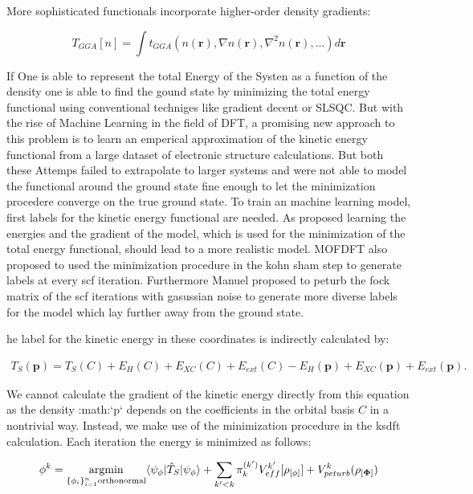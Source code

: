 More sophisticated functionals incorporate higher-order density gradients:

\begin{equation}
T_{GGA}[n] = \int t_{GGA}(n(\mathbf{r}), \nabla n(\mathbf{r}), \nabla^2 n(\mathbf{r}), ...) d\mathbf{r}
\end{equation}

If One is able to represent the total Energy of the Systen as a function of the density one is able to find the gound state by minimizing the total energy functional using conventional techniges like gradient decent or SLSQC.
But with the rise of Machine Learning in the field of DFT, a promising new approach to this problem is to learn an emperical approximation of the kinetic energy functional from a large dataset of electronic structure calculations. \cite{remmmmme}\cite{zhang_m-ofdft_2023}
But both these Attemps failed to extrapolate to larger systems and were not able to model the functional around the ground state fine enough to let the minimization procedere converge on the true ground state.
To train an machine learning model, first labels for the kinetic energy functional are needed. As \cite{zhang_m-ofdft_2023} proposed learning the energies and the gradient of the model, which is used for the minimization of the total energy functional, should lead to a more realistic model.
MOFDFT\cite{zhang_m-ofdft_2023} also proposed to used the minimization procedure in the kohn sham step to generate labels at every scf iteration. Furthermore Manuel proposed to peturb the fock matrix of the scf iterations with gasussian noise to generate more diverse labels for the model which lay further away from the ground state.

he label for the kinetic energy in these coordinates is indirectly calculated by:

\begin{align}
    T_S(\mathbf{p}) = T_S(C) + E_{H}(C) + E_{XC}(C) + E_{ext}(C) - E_{H}(\mathbf{p}) + E_{XC}(\mathbf{p}) + E_{ext}(\mathbf{p}).
\end{align}

We cannot calculate the gradient of the kinetic energy directly from this equation as the density :math:`p` depends on
the coefficients in the orbital basis $C$ in a nontrivial way.
Instead, we make use of the minimization procedure in the ksdft calculation. Each iteration the energy is minimized as follows:

\begin{align}
    \phi^{k} = \underset{\{\phi_i\}_{i=1}^n \text{orthonormal}}{\text{argmin}} \langle \psi_{\mathbf{\phi}} | \hat T_S | \psi_{\mathbf{\phi}} \rangle + \sum_{k'<k} \pi^{(k')}_k V_{eff}^{k'}[\rho_{[\mathbf{\phi}]}] + V_{peturb}^{k}(\rho_{[\mathbf{\Phi}]})
\end{align}


